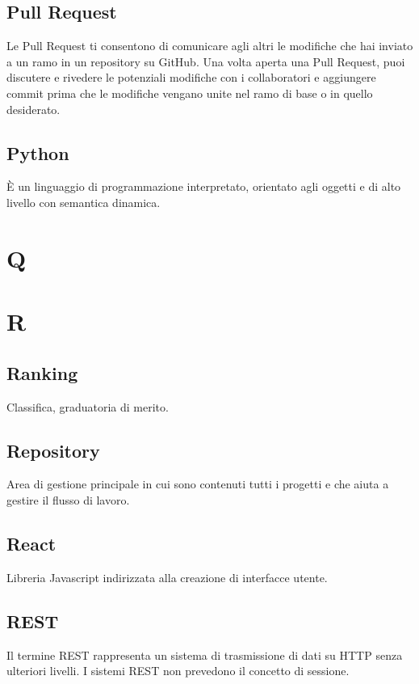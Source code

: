 \documentclass{classes/base}
\begin{document}
        \subsection*{Pull Request}
        Le Pull Request ti consentono di comunicare agli altri le modifiche che hai inviato a un ramo in un repository su GitHub. Una volta aperta una Pull Request, puoi discutere e rivedere le potenziali modifiche con i collaboratori e aggiungere commit prima che le modifiche vengano unite nel ramo di base o in quello desiderato.
        
        \subsection*{Python}
        È un linguaggio di programmazione interpretato, orientato agli oggetti e di alto livello con semantica dinamica.

        \newpage  
    \section{Q}
    \newpage  
    \section{R}
        \subsection*{Ranking} 
        Classifica, graduatoria di merito. 

        \subsection*{Repository}
        Area di gestione principale in cui sono contenuti tutti i progetti e che aiuta a gestire il flusso di lavoro.
        
        \subsection*{React}
        Libreria Javascript indirizzata alla creazione di interfacce utente.

        \subsection*{REST}
        Il termine REST rappresenta un sistema di trasmissione di dati su HTTP senza ulteriori livelli. I sistemi REST non prevedono il concetto di sessione.
\end{document}
